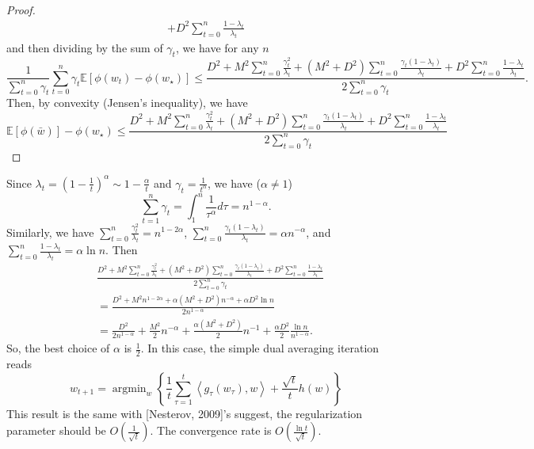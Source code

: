 \begin{proof}
\begin{equation}
\begin{split}
			+D^2\sum_{t=0}^{n}\frac{1-\lambda_t}{\lambda_t}
		\end{split}
	\end{equation}
	and then dividing by the sum of $\gamma_t$, we have for any $n$
	\begin{equation}
		\frac{1}{\sum_{t=0}^{n}\gamma_t} \sum_{t=0}^{n}\gamma_t\mathbb{E}\left[ \phi(w_t)-\phi(w_\star) \right]
		\leq
		\frac{D^2+M^2\sum_{t=0}^{n}\frac{\gamma_t^2}{\lambda_t}
			+(M^2+D^2)\sum_{t=0}^{n}\frac{\gamma_t(1-\lambda_t)}{\lambda_t}
			+D^2\sum_{t=0}^{n}\frac{1-\lambda_t}{\lambda_t}}{2\sum_{t=0}^{n}\gamma_t}.
	\end{equation}
	Then, by convexity (Jensen's inequality), we have
	\begin{equation}
		\mathbb{E}\left[\phi(\bar{w}) \right]-\phi(w_\star) \leq
		\frac{D^2+M^2\sum_{t=0}^{n}\frac{\gamma_t^2}{\lambda_t}
			+(M^2+D^2)\sum_{t=0}^{n}\frac{\gamma_t(1-\lambda_t)}{\lambda_t}
			+D^2\sum_{t=0}^{n}\frac{1-\lambda_t}{\lambda_t}}{2\sum_{t=0}^{n}\gamma_t}
	\end{equation}
\end{proof}

Since $\lambda_t=\left( 1-\frac{1}{t} \right)^\alpha \sim 1-\frac{\alpha}{t}$ and $\gamma_t=\frac{1}{t^\alpha}$, we have ($\alpha \neq 1$)
\begin{equation}
	\sum_{t=1}^{n} \gamma_t = \int_{1}^{n} \frac{1}{\tau^\alpha} d \tau
	=n^{1-\alpha}.
\end{equation}
Similarly, we have $\sum_{t=0}^{n} \frac{\gamma_t^2}{\lambda_t}=n^{1-2\alpha}$,  $\sum_{t=0}^{n}\frac{\gamma_t(1-\lambda_t)}{\lambda_t}= \alpha n^{-\alpha}$, 
and $\sum_{t=0}^{n}\frac{1-\lambda_t}{\lambda_t}=\alpha\ln n$.
Then
\begin{equation}
	\begin{split}
		&\frac{D^2+M^2\sum_{t=0}^{n}\frac{\gamma_t^2}{\lambda_t}
			+(M^2+D^2)\sum_{t=0}^{n}\frac{\gamma_t(1-\lambda_t)}{\lambda_t}
			+D^2\sum_{t=0}^{n}\frac{1-\lambda_t}{\lambda_t}}{2\sum_{t=0}^{n}\gamma_t}\\
		&=\frac{D^2+M^2 n^{1-2\alpha}+\alpha(M^2+D^2)n^{-\alpha} +\alpha D^2 \ln n}{2n^{1-\alpha}}\\
		&=\frac{D^2}{2n^{1-\alpha}} + \frac{M^2}{2} n^{-\alpha}  +\frac{\alpha(M^2+D^2)}{2}n^{-1} + \frac{\alpha D^2}{2} \frac{\ln n}{n^{1-\alpha}}.
	\end{split}
\end{equation}
So, the best choice of $\alpha$ is $\frac{1}{2}$.
In this case, the simple dual averaging iteration reads
\begin{equation}
	w_{t+1} = \mathop{\arg \min}_w \left\{ \frac{1}{t}\sum_{\tau=1}^{t} \left<g_{\tau}(w_\tau), w \right> + \frac{\sqrt{t}}{t} h(w) \right\}
\end{equation}
This result is the same with [Nesterov, 2009]'s suggest, the regularization parameter should be $O(\frac{1}{\sqrt{t}})$.
The convergence rate is $O(\frac{\ln t}{\sqrt{t}})$.

